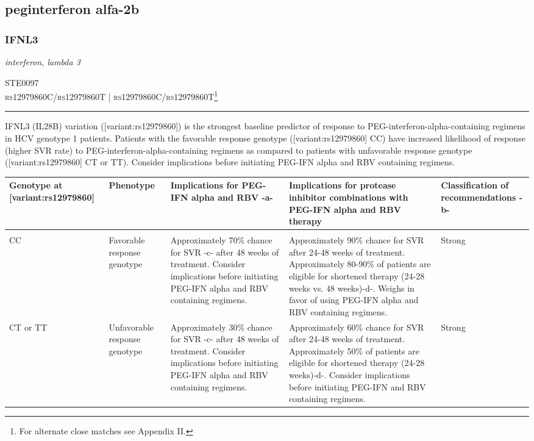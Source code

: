 \documentclass{report}
\begin{document}
\subsection{ peginterferon alfa-2b }

\subsubsection{ IFNL3 }
     \textit{ interferon, lambda 3 } \begin{flushright} \textsc{ STE0097 \\ rs12979860C/rs12979860T  | rs12979860C/rs12979860T\footnote{For alternate close matches see Appendix II.} }\end{flushright}
      \hrule \vspace{6pt}
      IFNL3 (IL28B) variation ([variant:rs12979860]) is the strongest baseline predictor of response to PEG-interferon-alpha-containing regimens in HCV genotype 1 patients.  Patients with the favorable response genotype ([variant:rs12979860] CC) have increased likelihood of response (higher SVR rate) to PEG-interferon-alpha-containing regimens as compared to patients with unfavorable response genotype ([variant:rs12979860] CT or TT). Consider implications before initiating PEG-IFN alpha and RBV containing regimens. \newline
      \scriptsize
      
      \begin{tabularx}{\textwidth}{ XXXXX }
      \textbf{ Genotype at [variant:rs12979860] }&\textbf{ Phenotype }&\textbf{ Implications for PEG-IFN alpha and RBV -a- }&\textbf{ Implications for protease inhibitor combinations with PEG-IFN alpha and RBV therapy }&\textbf{ Classification of recommendations -b- } \\ \hline \\  CC & Favorable response genotype & Approximately 70\% chance for SVR -c- after 48 weeks of treatment. Consider implications before initiating PEG-IFN alpha and RBV containing regimens. & Approximately 90\% chance for SVR after 24-48 weeks of treatment. Approximately 80-90\% of patients are eligible for shortened therapy (24-28 weeks vs. 48 weeks)-d-. Weighs in favor of using PEG-IFN alpha and RBV containing regimens.& Strong  \\  CT or TT & Unfavorable response genotype & Approximately 30\% chance for SVR -c- after 48 weeks of treatment. Consider implications before initiating PEG-IFN alpha and RBV containing regimens. & Approximately 60\% chance for SVR after 24-48 weeks of treatment. Approximately 50\% of patients are eligible for shortened therapy (24-28 weeks)-d-. Consider implications before initiating PEG-IFN and RBV containing regimens.& Strong  \\ 
      \end{tabularx}
      
\end{document}

